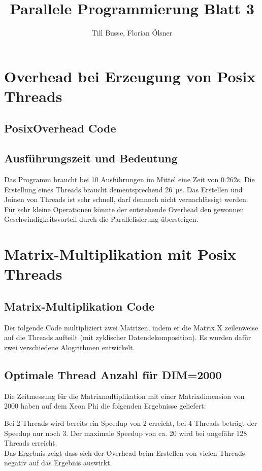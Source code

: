 \documentclass[12pt,a4paper]{article}
\author{Till Busse, Florian Ölsner}
\title{Parallele Programmierung Blatt 3}
\begin{document}
\maketitle
\pagebreak
\section{Overhead bei Erzeugung von Posix Threads}
\subsection{PosixOverhead Code}
\lstset{escapechar=@,style=customc}

\subsection{Ausführungszeit und Bedeutung}
Das Programm braucht bei 10 Ausführungen im Mittel eine Zeit von 0.262s. Die Erstellung eines Threads braucht dementsprechend \SI{26}{\micro\second}. Das Erstellen und Joinen von Threads ist sehr schnell, darf dennoch nicht vernachlässigt werden. Für sehr kleine Operationen könnte der entstehende Overhead den gewonnen Geschwindigkeitsvorteil durch die Parallelisierung übersteigen.
\pagebreak
\section{Matrix-Multiplikation mit Posix Threads}
\subsection{Matrix-Multiplikation Code}
Der folgende Code multipliziert zwei Matrizen, indem er die Matrix X zeilenweise auf die Threads aufteilt (mit zyklischer Datendekomposition). Es wurden dafür zwei verschiedene Alogrithmen entwickelt. 


\subsection{Optimale Thread Anzahl für DIM=2000}
Die Zeitmessung für die Matrixmultiplikation mit einer Matrixdimension von 2000 haben auf dem Xeon Phi die folgenden Ergebnisse geliefert:

Bei 2 Threads wird bereits ein Speedup von 2 erreicht, bei 4 Threads beträgt der Speedup nur noch 3. Der maximale Speedup von ca. 20 wird bei ungefähr 128 Threads erreicht.\\
Das Ergebnis zeigt dass sich der Overhead beim Erstellen von vielen Threads negativ auf das Ergebnis auswirkt.
\end{document}

